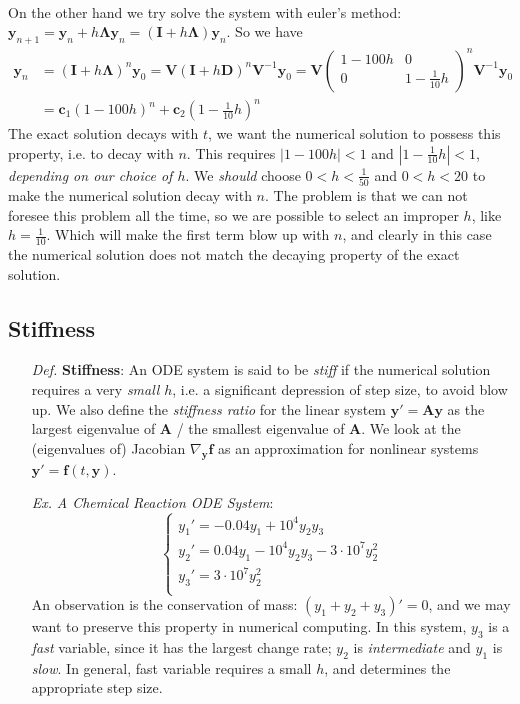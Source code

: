 \documentclass[a4paper, 11pt]{article}
\begin{document}
~\\
On the other hand we try solve the system with euler's method: $\bm{y}_{n+1} = \bm{y}_n + h \bm{\Lambda} \bm{y}_n = (\bm{I} + h \bm{\Lambda}) \bm{y}_n$. So we have
\begin{equation}
	\begin{split}
		\bm{y}_n &= (\bm{I}+h \bm{\Lambda})^n \bm{y}_0 = \bm{V} (\bm{I}+h \bm{D})^n \bm{V}^{-1}\bm{y}_0 = \bm{V} \begin{pmatrix}
		1-100h & 0\\
		0 & 1-\frac{1}{10}h
		\end{pmatrix}^n \bm{V}^{-1} \bm{y}_0 \\
		&= \bm{c}_1 (1-100h)^n + \bm{c}_2 (1-\tfrac{1}{10}h)^n
	\end{split}
\end{equation}
The exact solution decays with $t$, we want the numerical solution to possess this property, i.e. to decay with $n$. This requires $|1-100h|<1$ and $|1-\tfrac{1}{10}h|<1$, \emph{depending on our choice of $h$}. We \emph{should} choose $0<h<\frac{1}{50}$ and $0<h<20$ to make the numerical solution decay with $n$. The problem is that we can not foresee this problem all the time, so we are possible to select an improper $h$, like $h=\frac{1}{10}$. Which will make the first term blow up with $n$, and clearly in this case the numerical solution does not match the decaying property of the exact solution.

\subsection{Stiffness}
\begin{itemize}
	\item[\textit{Def.}] \textbf{Stiffness}: An ODE system is said to be \emph{stiff} if the numerical solution requires a very \emph{small} $h$, i.e. a significant depression of step size, to avoid blow up. We also define the \emph{stiffness ratio} for the linear system $\bm{y}' = \bm{A}\bm{y}$ as the largest eigenvalue of $\bm{A}$ / the smallest eigenvalue of $\bm{A}$. We look at the (eigenvalues of) Jacobian $\nabla_{\bm{y}} \bm{f}$ as an approximation for nonlinear systems $\bm{y}' = \bm{f}(t, \bm{y})$. 

	\item[\textit{Ex.}] \emph{A Chemical Reaction ODE System}:
	\begin{equation}
		\begin{cases}
			y_1' = -0.04 y_1 + 10^4 y_2 y_3 \\
			y_2' = 0.04 y_1 - 10^4 y_2 y_3 - 3\cdot 10^7 y_2^2\\
			y_3' = 3\cdot 10^7 y_2^2 \\
		\end{cases}
	\end{equation}
	An observation is the conservation of mass: $(y_1+y_2+y_3)'=0$, and we may want to preserve this property in numerical computing. In this system, $y_3$ is a \emph{fast} variable, since it has the largest change rate; $y_2$ is \emph{intermediate} and $y_1$ is \emph{slow}. In general, fast variable requires a small $h$, and determines the appropriate step size.
\end{itemize}
\end{document}
